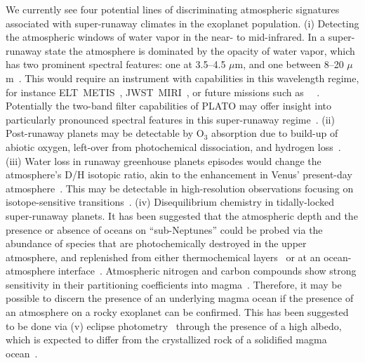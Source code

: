 \documentclass[twocolumn,twocolappendix]{aastex631}
\begin{document}
We currently see four potential lines of discriminating atmospheric signatures associated with super-runaway climates in the exoplanet population.
(i) Detecting the atmospheric windows of water vapor in the near- to mid-infrared.
In a super-runaway state the atmosphere is dominated by the opacity of water vapor, which has two prominent spectral features: one at 3.5--4.5 $\mu$m, and one between 8--20 $\mu$m~\citep[e.g.,][]{Boukrouche2021}.
This would require an instrument with capabilities in this wavelength regime, for instance ELT~METIS~\citep{Brandl2021}, JWST~MIRI~\citep{Rieke2015}, or future missions such as \life\ ~\citep{2019A&A...621A.125B,Quanz2022,2022A&A...664A..22D}.
Potentially the two-band filter capabilities of PLATO may offer insight into particularly pronounced spectral features in this super-runaway regime~\citep{2020SSRv..216...98G}.
(ii) Post-runaway planets may be detectable by O$_{3}$ absorption due to build-up of abiotic oxygen, left-over from photochemical dissociation, and hydrogen loss~\citep{2014ApJ...785L..20W,Luger2015}.
(iii) Water loss in runaway greenhouse planets episodes would change the atmosphere's D/H isotopic ratio, akin to the enhancement in Venus' present-day atmosphere~\citep{2019JGRE..124.2015K,2021JGRE..12606643K}.
This may be detectable in high-resolution observations focusing on isotope-sensitive transitions~\citep{2019AJ....158...26L,2019A&A...622A.139M}.
(iv) Disequilibrium chemistry in tidally-locked super-runaway planets.
It has been suggested that the atmospheric depth and the presence or absence of oceans on ``sub-Neptunes'' could be probed via the abundance of species that are photochemically destroyed in the upper atmosphere, and replenished from either thermochemical layers~\citep{2021ApJ...914...38Y,2021ApJ...922L..27T} or at an ocean-atmosphere interface~\citep{2019ApJ...887..231L,2021ApJ...921L...8H}.
Atmospheric nitrogen and carbon compounds show strong sensitivity in their partitioning coefficients into magma~\citep{2022E&PSL.59817847G,2022PSJ.....3...93B}.
Therefore, it may be possible to discern the presence of an underlying magma ocean if the presence of an atmosphere on a rocky exoplanet can be confirmed.
This has been suggested to be done via (v) eclipse photometry~\citep{Mansfield2019,2019ApJ...886..140K} through the presence of a high albedo, which is expected to differ from the crystallized rock of a solidified magma ocean~\citep{2020ApJ...898..160E,Fortin2022}.
\end{document}
